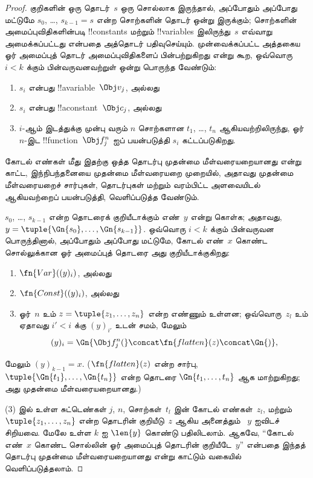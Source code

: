 \documentclass[../../../include/open-logic-section]{subfiles}
\begin{document}
\begin{proof}
குறிகளின் ஒரு தொடர்~$s$ ஒரு சொல்லாக இருந்தால், அப்போதும் அப்போது மட்டுமே
$s_0$, \dots, $s_{k-1} = s$ என்ற சொற்களின் தொடர் ஒன்று இருக்கும்; சொற்களின்
அமைப்புவிதிகளின்படி !!{constant}s மற்றும் !!{variable}s இலிருந்து~$s$
எவ்வாறு அமைக்கப்பட்டது என்பதை அத்தொடர் பதிவுசெய்யும். முன்வைக்கப்பட்ட
அத்தகைய ஓர் அமைப்புத் தொடர் அமைப்புவிதிகளைப் பின்பற்றுகிறது என்று கூற,
ஒவ்வொரு $i < k$ க்கும் பின்வருவனவற்றுள் ஒன்று பொருந்த வேண்டும்:
\begin{enumerate}
\item $s_i$ என்பது !!a{variable}~$\Obj v_j$, அல்லது
\item $s_i$ என்பது !!a{constant}~$\Obj c_j$, அல்லது
\item $i$-ஆம் இடத்துக்கு முன்பு வரும் $n$ சொற்களான $t_1$, \dots, $t_n$
  ஆகியவற்றிலிருந்து, ஓர் $n$-இட !!{function}~$\Obj f^n_j$ ஐப் பயன்படுத்தி
  $s_i$ கட்டப்படுகிறது.
\end{enumerate}
கோடல் எண்கள் மீது இதற்கு ஒத்த தொடர்பு முதன்மை மீள்வரையறையானது என்று காட்ட,
இந்நிபந்தனையை முதன்மை மீள்வரையறை முறையில், அதாவது முதன்மை மீள்வரையறைச்
சார்புகள், தொடர்புகள் மற்றும் வரம்பிட்ட அளவையிடல் ஆகியவற்றைப் பயன்படுத்தி,
வெளிப்படுத்த வேண்டும்.

$s_0$, \dots, $s_{k-1}$ என்ற தொடரைக் குறியீடாக்கும் எண்~$y$ என்று கொள்க;
அதாவது, $y = \tuple{\Gn{s_0}, \dots, \Gn{s_{k-1}}}$. ஒவ்வொரு $i < k$
க்கும் பின்வருவன பொருந்தினால், அப்போதும் அப்போது மட்டுமே, கோடல் எண்~$x$
கொண்ட சொல்லுக்கான ஓர் அமைப்புத் தொடரை அது குறியீடாக்குகிறது:
\begin{enumerate}
\item $\fn{Var}((y)_i)$, அல்லது
\item $\fn{Const}((y)_i)$, அல்லது
\item ஓர்~$n$ உம் $z = \tuple{z_1, \dots, z_n}$ என்ற எண்ணும் உள்ளன;
  ஒவ்வொரு~$z_l$ உம் ஏதாவது $i' < i$ க்கு $(y)_{i'}$ உடன் சமம், மேலும்
\[
(y)_i = \Gn{\Obj f^n_j(} \concat \fn{flatten}(z) \concat \Gn{)},
\]
\end{enumerate}
மேலும் $(y)_{k-1} = x$. ($\fn{flatten}(z)$ என்ற சார்பு,
$\tuple{\Gn{t_1}, \dots, \Gn{t_n}}$ என்ற தொடரை $\Gn{t_1, \dots,
  t_n}$ ஆக மாற்றுகிறது; அது முதன்மை மீள்வரையறையானது.)

(3) இல் உள்ள சுட்டெண்கள் $j$, $n$, சொற்கள்~$t_l$ இன் கோடல் எண்கள்~$z_l$,
மற்றும் $\tuple{z_1, \dots, z_n}$ என்ற தொடரின் குறியீடு~$z$ ஆகிய அனைத்தும்
~$y$ ஐவிடச் சிறியவை. மேலே உள்ள $k$ ஐ $\len{y}$ கொண்டு பதிலிடலாம். ஆகவே,
``கோடல் எண்~$x$ கொண்ட சொல்லின் ஓர் அமைப்புத் தொடரின் குறியீடே~$y$'' என்பதை
இந்தத் தொடர்பு முதன்மை மீள்வரையறையானது என்று காட்டும் வகையில் வெளிப்படுத்தலாம்.


\end{proof}
\end{document}
